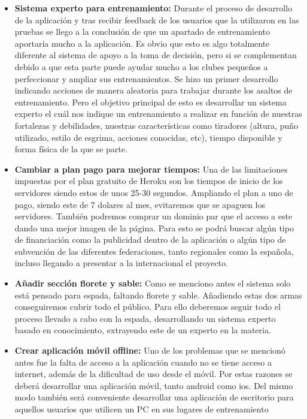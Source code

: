 \begin{itemize}
  \item \textbf{Sistema experto para entrenamiento:} Durante el proceso de desarrollo de
    la aplicación y tras recibir feedback de los usuarios que la utilizaron en las pruebas
    se llego a la conclusión de que un apartado de entrenamiento aportaría mucho a la aplicación.
    Es obvio que esto es algo totalmente diferente al sistema de apoyo a la toma de decisión,
    pero si se complementan debido a que esta parte puede ayudar mucho a los clubes pequeños
    a perfeccionar y ampliar sus entrenamientos. Se hizo un primer desarrollo indicando
    acciones de manera aleatoria para trabajar durante los asaltos de entrenamiento. Pero el
    objetivo principal de esto es desarrollar un sistema experto el cuál nos indique un
    entrenamiento a realizar en función de nuestras fortalezas y debilidades, nuestras
    características como tiradores (altura, puño utilizado, estilo de esgrima,
    acciones conocidas, etc), tiempo disponible y forma física de la que se parte.
  \item \textbf{Cambiar a plan pago para mejorar tiempos:} Una de las limitaciones
    impuestas por el plan gratuito de Heroku son los tiempos de inicio de los servidores
    siendo estos de unos 25-30 segundos. Ampliando el plan a uno de pago, siendo este
    de 7 dolares al mes, evitaremos que se apaguen los servidores. También podremos
    comprar un dominio par que el acceso a este dando una mejor imagen de la página.
    Para esto se podrá buscar algún tipo de financiación como la publicidad dentro
    de la aplicación o algún tipo de subvención de las diferentes federaciones, tanto
    regionales como la española, incluso llegando a presentar a la internacional el
    proyecto.
  \item \textbf{Añadir sección florete y sable:} Como se menciono antes el sistema
    solo está pensado para espada, faltando florete y sable. Añadiendo estas dos
    armas conseguiremos cubrir todo el público. Para ello deberemos seguir
    todo el proceso llevado a cabo con la espada, desarrollando un sistema experto
    basado en conocimiento, extrayendo este de un experto en la materia.
  \item \textbf{Crear aplicación móvil offline:} Uno de los problemas
    que se mencionó antes fue la falta de acceso a la aplicación cuando no se
    tiene acceso a internet, además de la dificultad de uso desde el móvil.
    Por estas razones se deberá desarrollar una aplicación móvil, tanto android
    como ios. Del mismo modo también será conveniente desarrollar una aplicación
    de escritorio para aquellos usuarios que utilicen un PC en sus lugares de entrenamiento
\end{itemize}
